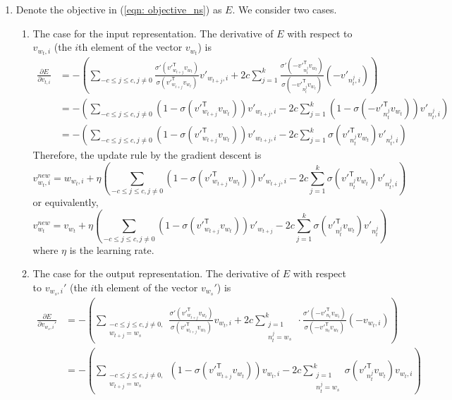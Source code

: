\documentclass[
	12pt, %
]{../Template/fphw}
\newcommand{\T}{\mathsf{T}}
\begin{document}
\begin{enumerate}[label=(\arabic*)]
    \item Denote the objective in (\ref{eqn: objective_ns}) as $E$. We consider two cases.
        \begin{enumerate}[label=(\roman*)]
            \item The case for the input representation. The derivative of $E$ with respect to $v_{w_t,i}$ (the $i$th element of the vector $v_{w_t}$) is
            \begin{align}
                \frac{\partial E}{\partial v_{t,i}} &= -\left(\sum_{-c\leq j \leq c, j\neq 0}  \frac{\sigma'(v'^\T_{w_{t+j}} v_{w_t})}{\sigma(v'^\T_{w_{t+j}} v_{w_t})}v'_{w_{t+j},i}+2c\sum_{j=1}^{k}\frac{\sigma'(-v'^\T_{n_t^j} v_{w_t})}{\sigma(-v'^\T_{n_t^j} v_{w_t})}(-v'_{n_t^j,i}) \right) \\ &= -\left(\sum_{-c\leq j \leq c, j\neq 0}  (1-\sigma(v'^\T_{w_{t+j}} v_{w_t}))v'_{w_{t+j},i}-2c\sum_{j=1}^{k}(1-\sigma(-v'^\T_{n_t^j} v_{w_t}))v'_{n_t^j,i} \right) \\ &=-\left(\sum_{-c\leq j \leq c, j\neq 0}  (1-\sigma(v'^\T_{w_{t+j}} v_{w_t}))v'_{w_{t+j},i}-2c\sum_{j=1}^{k}\sigma(v'^\T_{n_t^j} v_{w_t})v'_{n_t^j,i} \right)
            \end{align}
            Therefore, the update rule by the gradient descent is
            \begin{equation}
                v_{w_t,i}^{new} = w_{w_t,i}+\eta\left(\sum_{-c\leq j \leq c, j\neq 0}  (1-\sigma(v'^\T_{w_{t+j}} v_{w_t}))v'_{w_{t+j},i}-2c\sum_{j=1}^{k}\sigma(v'^\T_{n_t^j} v_{w_t})v'_{n_t^j,i} \right)
            \end{equation}
            or equivalently,
            \begin{equation}
                v_{w_t}^{new} = v_{w_t}+\eta\left(\sum_{-c\leq j \leq c, j\neq 0}  (1-\sigma(v'^\T_{w_{t+j}} v_{w_t}))v'_{w_{t+j}}-2c\sum_{j=1}^{k}\sigma(v'^\T_{n_t^j} v_{w_t})v'_{n_t^j} \right)
            \end{equation}
            where $\eta$ is the learning rate.
            \item The case for the output representation. The derivative of $E$ with respect to $v_{w_s,i}'$ (the $i$th element of the vector $v_{w_s}'$) is
            \begin{align}
                \frac{\partial E}{\partial v_{w_s,i}'} &= -\left(\sum_{\substack{-c\leq j \leq c, j\neq 0, \\ w_{t+j}=w_s}}\frac{\sigma'(v'^\T_{w_{t+j}} v_{w_t})}{\sigma(v'^\T_{w_{t+j}}v_{w_t})} v_{w_t,i}+2c \sum_{\substack{j=1 \\n_t^{j}=w_s}}^{k}\cdot\frac{\sigma'(-v'^\T_{n_t} v_{w_t})}{\sigma(-v'^\T_{n_t} v_{w_t})}(-v_{w_t,i}) \right) \\ &=-\left(\sum_{\substack{-c\leq j \leq c, j\neq 0, \\ w_{t+j}=w_s}}(1-\sigma(v'^\T_{w_{t+j}} v_{w_t})) v_{w_t,i}-2c\sum_{\substack{j=1\\n_t^j = w_s}}^k\sigma(v'^\T_{n_t^j} v_{w_t})v_{w_t,i} \right)

\end{align}
\end{enumerate}
\end{enumerate}
\end{document}
